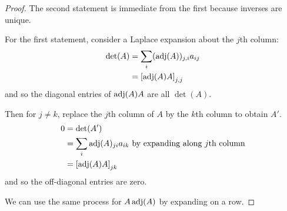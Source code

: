 \documentclass[../Main.tex]{subfiles}
\begin{document}
\begin{proof}
    The second statement is immediate from the first because inverses are unique.

    For the first statement, consider a Laplace expansion about the $j$th column:
    \begin{align*}
        \det(A) &= \sum_i (\operatorname{adj}(A))_{j, i} a_{ij} \\
        &= \left[\operatorname{adj}(A) A\right]_{j, j}
    \end{align*}
    and so the diagonal entries of $\operatorname{adj}(A) A$ are all $\det(A)$.

    Then for $j \neq k$, replace the $j$th column of $A$ by the $k$th column to obtain $A'$.
    \begin{align*}
        0 &= \det(A')\\
        &= \sum_{i} \operatorname{adj}(A)_{ji} a_{ik} \text{ by expanding along } j\text{th column} \\
        &= \left[\operatorname{adj}(A) A\right]_{jk}
    \end{align*}
    and so the off-diagonal entries are zero.

    We can use the same process for $A \operatorname{adj}(A)$ by expanding on a row.
\end{proof}
\end{document}
